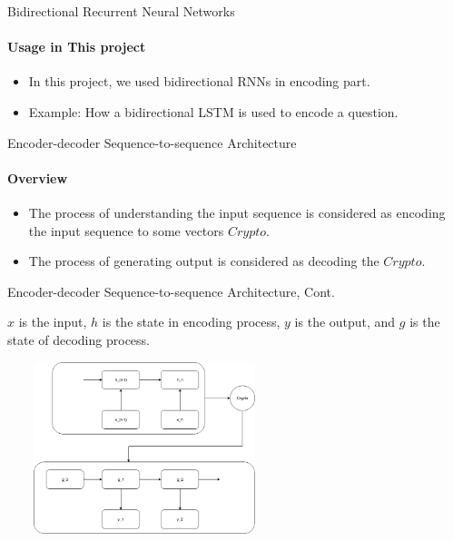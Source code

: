 \documentclass{beamer}
\begin{document}
\begin{frame}{Bidirectional Recurrent Neural Networks}\framesubtitle{Usage in This project}
    \begin{itemize}
        \item In this project, we used bidirectional RNNs in encoding part.
        \item Example: How a bidirectional LSTM is used to encode a question.
    \end{itemize}
\end{frame}

\begin{frame}{Encoder-decoder Sequence-to-sequence Architecture}\framesubtitle{Overview}
\begin{itemize}
    \item The process of understanding the input sequence is considered as encoding the input sequence to some vectors $Crypto$.
    \item The process of generating output is considered as decoding the $Crypto$.
\end{itemize}



\end{frame}

\begin{frame}{Encoder-decoder Sequence-to-sequence Architecture, Cont.}
\begin{examples}
$x$ is the input, $h$ is the state in encoding process, $y$ is the output, and $g$ is the state of decoding process.
\begin{center}
        \includegraphics[width=8cm, height=5cm]{figures/encoderDecoder.png}
    \end{center}
\end{examples}

\end{frame}
\end{document}
